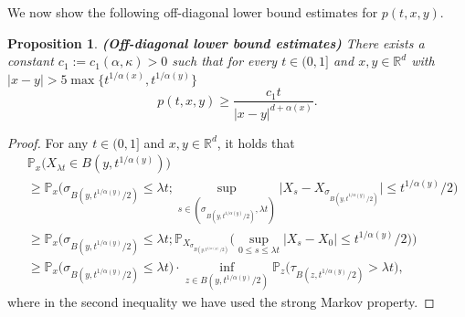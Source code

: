 \documentclass[a4paper,11pt]{amsart}
\renewcommand{\le}{\leqslant}
\renewcommand{\ge}{\geqslant}
\newcommand{\R}{\mathds R}
\newcommand{\Pp}{\mathds P}
\newcommand{\K}{\kappa}
\newcommand{\A}{\alpha}
\newtheorem{proposition}[theorem]{Proposition}
\theoremstyle{definition}
\begin{document}
We now show the following off-diagonal lower bound estimates for $p(t,x,y)$.


\begin{proposition}{\bf (Off-diagonal lower bound estimates)} \label{t4-4}
There exists a constant $c_1:=c_1(\A,\K)>0$ such that for every $t\in (0,1]$ and $x,y\in\R^d$ with
$|x-y|>5\max\{t^{{1}/{\A(x)}},t^{{1}/{\A(y)}}\}$
\begin{equation}\label{t4-4-1}
p(t,x,y)\ge \frac{c_1t}{|x-y|^{d+\A(x)}}.
\end{equation}
\end{proposition}
\begin{proof}
For any $t\in (0,1]$ and $x,y\in\R^d$, it holds that
\begin{equation}\label{t4-4-2}
\begin{split}
&\Pp_x\big(X_{\lambda t}\in B(y,t^{{1}/{\A(y)}})\big)\\
&\ge \Pp_x\big(\sigma_{B(y,t^{{1}/{\A(y)}}/2)}\le \lambda t;
\sup_{s \in (\sigma_{B(y,t^{{1}/{\A(y)}}/2)},\lambda t)}\big|X_s-X_{\sigma_{B(y,t^{{1}/{\A(y)}}/2)}}\big|\le t^{{1}/{\A(y)}}/2\big)\\
&\ge\Pp_x\big(\sigma_{B(y,t^{{1}/{\A(y)}}/2)}\le \lambda t ;\Pp_{X_{\sigma_{B(y,
t^{{1}/{\A(y)}}/2)}}}\big(\sup_{0\le s \le \lambda t}|X_s-X_0|\le
 t^{{1}/{\A(y)}}/2\big)\big)\\
&\ge \Pp_x\big(\sigma_{B(y,t^{{1}/{\A(y)}}/2)}\le \lambda t\big)
\cdot \inf_{z \in B(y,t^{{1}/{\A(y)}}/2)}\Pp_z\big(
\tau_{B(z,t^{{1}/{\A(y)}}/2)}>\lambda t\big),
\end{split}
\end{equation}
where in the second inequality we have used the strong Markov property.


\end{proof}
\end{document}
